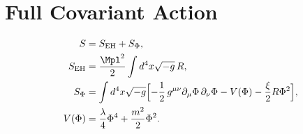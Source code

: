 \providecommand{\PhiField}{\Phi}
\section{Full Covariant Action}\label{sec:action}


\begin{align}
S &= S_{\text{EH}} + S_{\Phi}, \\
S_{\text{EH}} &= \frac{\Mpl^{2}}{2}\int d^{4}x\sqrt{-g}\,R, \\
S_{\Phi} &= \int d^{4}x\sqrt{-g}\Bigl[
  -\frac12\,g^{\mu\nu}\partial_\mu\PhiField\,\partial_\nu\PhiField
  - V(\PhiField) - \frac{\xi}{2} R\PhiField^{2}
\Bigr], \\
V(\PhiField) &= \frac{\lambda}{4}\PhiField^{4} + \frac{m^{2}}{2}\PhiField^{2}.
\end{align}
